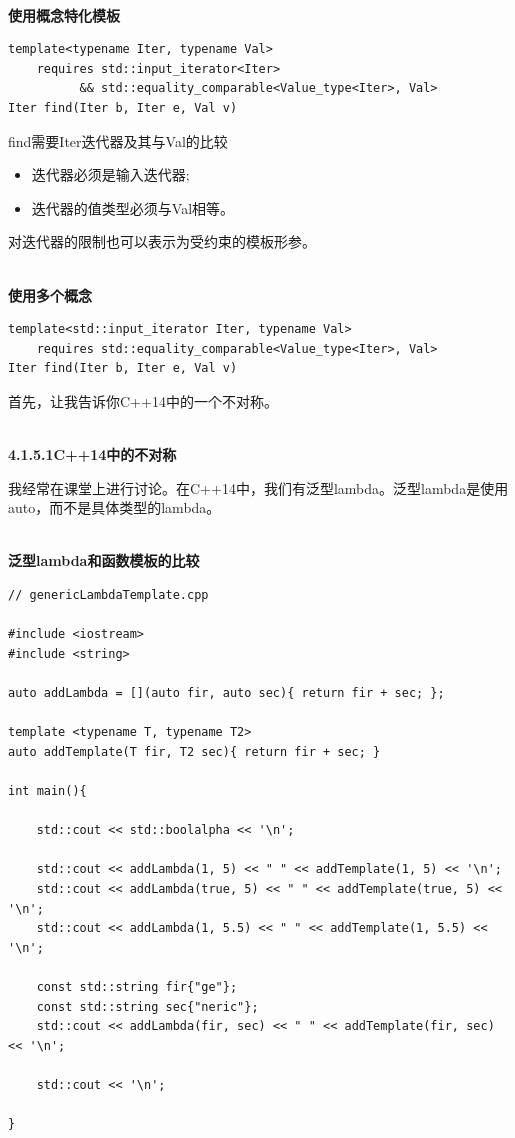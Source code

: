 \hspace*{\fill} \\ %
\noindent
\textbf{使用概念特化模板}
\begin{lstlisting}[style=styleCXX]
template<typename Iter, typename Val>
	requires std::input_iterator<Iter>
		  && std::equality_comparable<Value_type<Iter>, Val>
Iter find(Iter b, Iter e, Val v)
\end{lstlisting}

find需要Iter迭代器及其与Val的比较

\begin{itemize}
\item 
迭代器必须是输入迭代器;

\item 
迭代器的值类型必须与Val相等。
\end{itemize}

对迭代器的限制也可以表示为受约束的模板形参。

\hspace*{\fill} \\ %
\noindent
\textbf{使用多个概念}
\begin{lstlisting}[style=styleCXX]
template<std::input_iterator Iter, typename Val>
	requires std::equality_comparable<Value_type<Iter>, Val>
Iter find(Iter b, Iter e, Val v)
\end{lstlisting}


首先，让我告诉你C++14中的一个不对称。

\hspace*{\fill} \\ %
\noindent
\textbf{4.1.5.1\hspace{0.2cm}C++14中的不对称}

我经常在课堂上进行讨论。在C++14中，我们有泛型lambda。泛型lambda是使用auto，而不是具体类型的lambda。

\hspace*{\fill} \\ %
\noindent
\textbf{泛型lambda和函数模板的比较}
\begin{lstlisting}[style=styleCXX]
// genericLambdaTemplate.cpp

#include <iostream>
#include <string>

auto addLambda = [](auto fir, auto sec){ return fir + sec; };

template <typename T, typename T2>
auto addTemplate(T fir, T2 sec){ return fir + sec; }

int main(){

	std::cout << std::boolalpha << '\n';
	
	std::cout << addLambda(1, 5) << " " << addTemplate(1, 5) << '\n';
	std::cout << addLambda(true, 5) << " " << addTemplate(true, 5) << '\n';
	std::cout << addLambda(1, 5.5) << " " << addTemplate(1, 5.5) << '\n';
	
	const std::string fir{"ge"};
	const std::string sec{"neric"};
	std::cout << addLambda(fir, sec) << " " << addTemplate(fir, sec) << '\n';
	
	std::cout << '\n';

}
\end{lstlisting}

